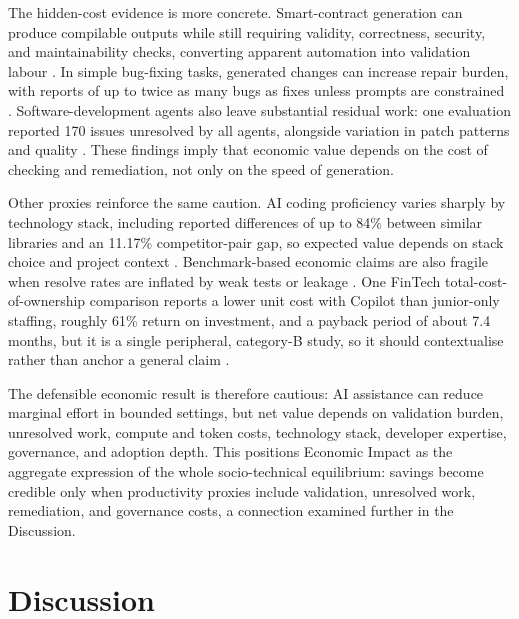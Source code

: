 The hidden-cost evidence is more concrete. Smart-contract generation can produce compilable outputs while still requiring validity, correctness, security, and maintainability checks, converting apparent automation into validation labour \cite{karanjai_who_2023}. In simple bug-fixing tasks, generated changes can increase repair burden, with reports of up to twice as many bugs as fixes unless prompts are constrained \cite{jesse_large_2023}. Software-development agents also leave substantial residual work: one evaluation reported 170 issues unresolved by all agents, alongside variation in patch patterns and quality \cite{chen_evaluating_2024}. These findings imply that economic value depends on the cost of checking and remediation, not only on the speed of generation.

Other proxies reinforce the same caution. AI coding proficiency varies sharply by technology stack, including reported differences of up to 84\% between similar libraries and an 11.17\% competitor-pair gap, so expected value depends on stack choice and project context \cite{zhang_rethinking_2025}. Benchmark-based economic claims are also fragile when resolve rates are inflated by weak tests or leakage \cite{aleithan_swe-bench_2024}. One FinTech total-cost-of-ownership comparison reports a lower unit cost with Copilot than junior-only staffing, roughly 61\% return on investment, and a payback period of about 7.4 months, but it is a single peripheral, category-B study, so it should contextualise rather than anchor a general claim \cite{rodriguez_comparative_2025}.

The defensible economic result is therefore cautious: AI assistance can reduce marginal effort in bounded settings, but net value depends on validation burden, unresolved work, compute and token costs, technology stack, developer expertise, governance, and adoption depth. This positions Economic Impact as the aggregate expression of the whole socio-technical equilibrium: savings become credible only when productivity proxies include validation, unresolved work, remediation, and governance costs, a connection examined further in the Discussion.


\section{Discussion}
\label{sec:discussion}

